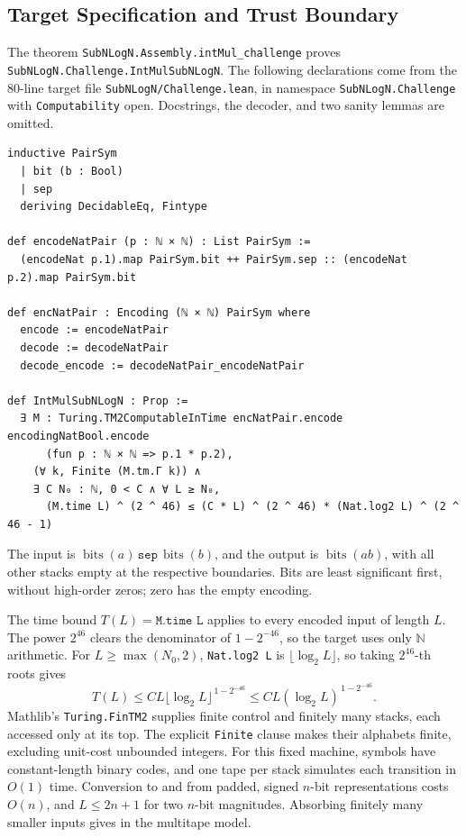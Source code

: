 \documentclass[11pt]{article}
\theoremstyle{definition}
\renewcommand{\label}[1]{}%
\newcommand{\N}{\mathbb{N}}
\begin{document}
\subsection{Target Specification and Trust Boundary}\label{sec:lean-spec}\label{sec:lean-trust}

The theorem
\texttt{SubNLogN.\allowbreak Assembly.\allowbreak intMul\_\allowbreak challenge}
proves \texttt{SubNLogN.\allowbreak Challenge.\allowbreak IntMul\allowbreak SubNLogN}.
The following declarations come from the 80-line target file
\texttt{SubNLogN/\allowbreak Challenge.\allowbreak lean}, in namespace
\texttt{SubNLogN.\allowbreak Challenge} with \texttt{Computability} open.
Docstrings, the decoder, and two sanity lemmas are omitted.
\begingroup
\lstset{breaklines=true,breakatwhitespace=true}
\begin{lstlisting}[style=leanstyle]
inductive PairSym
  | bit (b : Bool)
  | sep
  deriving DecidableEq, Fintype

def encodeNatPair (p : ℕ × ℕ) : List PairSym :=
  (encodeNat p.1).map PairSym.bit ++ PairSym.sep :: (encodeNat p.2).map PairSym.bit

def encNatPair : Encoding (ℕ × ℕ) PairSym where
  encode := encodeNatPair
  decode := decodeNatPair
  decode_encode := decodeNatPair_encodeNatPair

def IntMulSubNLogN : Prop :=
  ∃ M : Turing.TM2ComputableInTime encNatPair.encode encodingNatBool.encode
      (fun p : ℕ × ℕ => p.1 * p.2),
    (∀ k, Finite (M.tm.Γ k)) ∧
    ∃ C N₀ : ℕ, 0 < C ∧ ∀ L ≥ N₀,
      (M.time L) ^ (2 ^ 46) ≤ (C * L) ^ (2 ^ 46) * (Nat.log2 L) ^ (2 ^ 46 - 1)
\end{lstlisting}
\endgroup
The input is $\operatorname{bits}(a)\,\texttt{sep}\,\operatorname{bits}(b)$,
and the output is $\operatorname{bits}(ab)$, with all other stacks empty at
the respective boundaries. Bits are least significant first, without
high-order zeros; zero has the empty encoding.

The time bound $T(L)=\texttt{M.time L}$ applies to every encoded input of
length $L$. The power $2^{46}$ clears the denominator of $1-2^{-46}$,
so the target uses only $\N$ arithmetic.
For $L\ge\max(N_0,2)$, \texttt{Nat.log2 L} is $\lfloor\log_2 L\rfloor$,
so taking $2^{46}$-th roots gives
\[
 T(L)\le CL\lfloor\log_2 L\rfloor^{\,1-2^{-46}}
       \le CL(\log_2 L)^{\,1-2^{-46}}.
\]
Mathlib's \texttt{Turing.\allowbreak FinTM2} supplies finite control and
finitely many stacks, each accessed only at its top.
The explicit \texttt{Finite} clause makes their alphabets finite,
excluding unit-cost unbounded integers.
For this fixed machine, symbols have constant-length binary codes, and one
tape per stack simulates each transition in $O(1)$ time.
Conversion to and from padded, signed $n$-bit representations costs $O(n)$,
and $L\le2n+1$ for two $n$-bit magnitudes.
Absorbing finitely many smaller inputs gives  in the multitape model.
\end{document}
